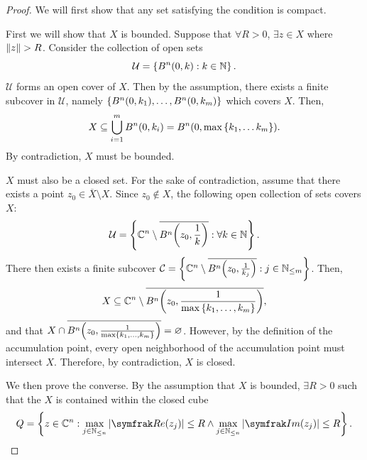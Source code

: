 \begin{proof}
    We will first show that any set satisfying the condition is compact.

    First we will show that \(X\) is bounded. Suppose that \(\forall R>0\), \(\exists z\in X\) where \(\norm{z}>R\). Consider the collection of open sets \[\mathcal{U}=\cbraces{B^n(0,k)}{k\in\mathbb{N}}.\] \(\mathcal{U}\) forms an open cover of \(X\). Then by the assumption, there exists a finite subcover in \(\mathcal{U}\), namely \(\cbraces{B^n(0,k_1),\ldots,B^n(0,k_m)}\) which covers \(X\). Then, \[X\subseteq\bigcup_{i=1}^mB^n(0,k_i)=B^n\qty(0,\max\cbraces{k_1,\ldots k_m}).\] By contradiction, \(X\) must be bounded.

    \(X\) must also be a closed set. For the sake of contradiction, assume that there exists a point \(z_0\in\overline{X}\setminus X\). Since \(z_0\notin X\), the following open collection of sets covers \(X\):
    \[\mathcal{U}=\cbraces{\mathbb{C}^n\setminus\overline{B^n\qty(z_0,\frac{1}{k})}}{\forall k\in\mathbb{N}}.\]
    There then exists a finite subcover \(\mathcal{C}=\cbraces{\mathbb{C}^n\setminus\overline{B^n\qty(z_0,\frac{1}{k_j})}}{j\in\mathbb{N}_{\leq m}}\). Then, \[X\subseteq\mathbb{C}^n\setminus\overline{B^n\qty(z_0,\frac{1}{\max\cbraces{k_1,\ldots,k_m}})},\]
    and that \(X\cap\overline{B^n\qty(z_0,\frac{1}{\max\cbraces{k_1,\ldots,k_m}})}=\varnothing\). However, by the definition of the accumulation point, every open neighborhood of the accumulation point must intersect \(X\). Therefore, by contradiction, \(X\) is closed.

    We then prove the converse. By the assumption that \(X\) is bounded, \(\exists R>0\) such that the \(X\) is contained within the closed cube \[Q=\cbraces{z\in\mathbb{C}^n}{\max_{j\in\mathbb{N}_{\leq n}}\abs{\Re(z_j)}\le R\wedge\max_{j\in\mathbb{N}_{\leq n}}\abs{\Im(z_j)}\le R}.\]


\end{proof}
